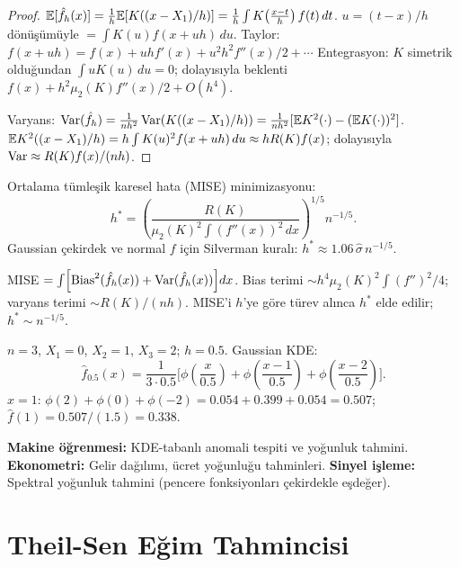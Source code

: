 \begin{proof}
$\mathbb{E}[\hat{f}_h(x)] = \frac{1}{h}\mathbb{E}[K((x-X_1)/h)] = \frac{1}{h}\int K\!\left(\frac{x-t}{h}\right)f(t)\,dt$. $u=(t-x)/h$ dönüşümüyle $= \int K(u)f(x+uh)\,du$. Taylor: $f(x+uh)=f(x)+uhf'(x)+u^2h^2f''(x)/2+\cdots$ Entegrasyon: $K$ simetrik olduğundan $\int uK(u)\,du=0$; dolayısıyla beklenti $f(x)+h^2\mu_2(K)f''(x)/2+O(h^4)$.

Varyans: $\operatorname{Var}(\hat{f}_h)=\frac{1}{nh^2}\operatorname{Var}(K((x-X_1)/h))=\frac{1}{nh^2}[\mathbb{E} K^2(\cdot)-(\mathbb{E} K(\cdot))^2]$. $\mathbb{E} K^2((x-X_1)/h)=h\int K(u)^2 f(x+uh)\,du\approx hR(K)f(x)$; dolayısıyla $\operatorname{Var}\approx R(K)f(x)/(nh)$.
\end{proof}

\begin{teorem}\label{thm:optimal_bandwidth}
Ortalama tümleşik karesel hata (MISE) minimizasyonu:
\[
  h^* = \left(\frac{R(K)}{\mu_2(K)^2\int (f''(x))^2\,dx}\right)^{1/5} n^{-1/5}.
\]
Gaussian çekirdek ve normal $f$ için Silverman kuralı: $h^* \approx 1.06\,\hat\sigma\,n^{-1/5}$.
\end{teorem}

\begin{ispatiskele}
MISE $=\int\!\left[\text{Bias}^2(\hat{f}_h(x))+\operatorname{Var}(\hat{f}_h(x))\right]\!dx$. Bias terimi $\sim h^4\mu_2(K)^2\int(f'')^2/4$; varyans terimi $\sim R(K)/(nh)$. MISE'i $h$'ye göre türev alınca $h^*$ elde edilir; $h^*\sim n^{-1/5}$.
\end{ispatiskele}

\begin{ornek}
$n=3$, $X_1=0$, $X_2=1$, $X_3=2$; $h=0.5$. Gaussian KDE:
\[
  \hat{f}_{0.5}(x) = \frac{1}{3\cdot0.5}\bigl[\phi\!\left(\frac{x}{0.5}\right)+\phi\!\left(\frac{x-1}{0.5}\right)+\phi\!\left(\frac{x-2}{0.5}\right)\bigr].
\]
$x=1$: $\phi(2)+\phi(0)+\phi(-2)=0.054+0.399+0.054=0.507$; $\hat{f}(1)=0.507/(1.5)=0.338$.
\end{ornek}

\begin{disiplinlerarasibaglan}
\textbf{Makine öğrenmesi:} KDE-tabanlı anomali tespiti ve yoğunluk tahmini. \textbf{Ekonometri:} Gelir dağılımı, ücret yoğunluğu tahminleri. \textbf{Sinyel işleme:} Spektral yoğunluk tahmini (pencere fonksiyonları çekirdekle eşdeğer).
\end{disiplinlerarasibaglan}

\section{Theil-Sen Eğim Tahmincisi}
\label{sec:theil_sen}

